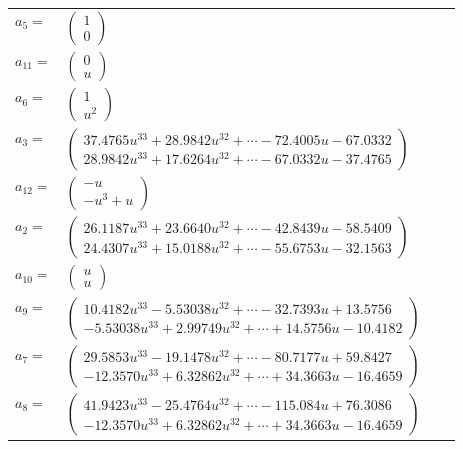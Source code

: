 \documentclass[1p]{elsarticle_modified}
\theoremstyle{definition}
\begin{document}
\begin{tabular}{m{7pt} m{180pt} m{7pt} m{180pt} }
\flushright $a_{5}=$&$\begin{pmatrix}1\\0\end{pmatrix}$ \\
\flushright $a_{11}=$&$\begin{pmatrix}0\\u\end{pmatrix}$ \\
\flushright $a_{6}=$&$\begin{pmatrix}1\\u^2\end{pmatrix}$ \\
\flushright $a_{3}=$&$\begin{pmatrix}37.4765 u^{33}+28.9842 u^{32}+\cdots-72.4005 u-67.0332\\28.9842 u^{33}+17.6264 u^{32}+\cdots-67.0332 u-37.4765\end{pmatrix}$ \\
\flushright $a_{12}=$&$\begin{pmatrix}- u\\- u^3+u\end{pmatrix}$ \\
\flushright $a_{2}=$&$\begin{pmatrix}26.1187 u^{33}+23.6640 u^{32}+\cdots-42.8439 u-58.5409\\24.4307 u^{33}+15.0188 u^{32}+\cdots-55.6753 u-32.1563\end{pmatrix}$ \\
\flushright $a_{10}=$&$\begin{pmatrix}u\\u\end{pmatrix}$ \\
\flushright $a_{9}=$&$\begin{pmatrix}10.4182 u^{33}-5.53038 u^{32}+\cdots-32.7393 u+13.5756\\-5.53038 u^{33}+2.99749 u^{32}+\cdots+14.5756 u-10.4182\end{pmatrix}$ \\
\flushright $a_{7}=$&$\begin{pmatrix}29.5853 u^{33}-19.1478 u^{32}+\cdots-80.7177 u+59.8427\\-12.3570 u^{33}+6.32862 u^{32}+\cdots+34.3663 u-16.4659\end{pmatrix}$ \\
\flushright $a_{8}=$&$\begin{pmatrix}41.9423 u^{33}-25.4764 u^{32}+\cdots-115.084 u+76.3086\\-12.3570 u^{33}+6.32862 u^{32}+\cdots+34.3663 u-16.4659\end{pmatrix}$ \\

\end{tabular}
\end{document}
